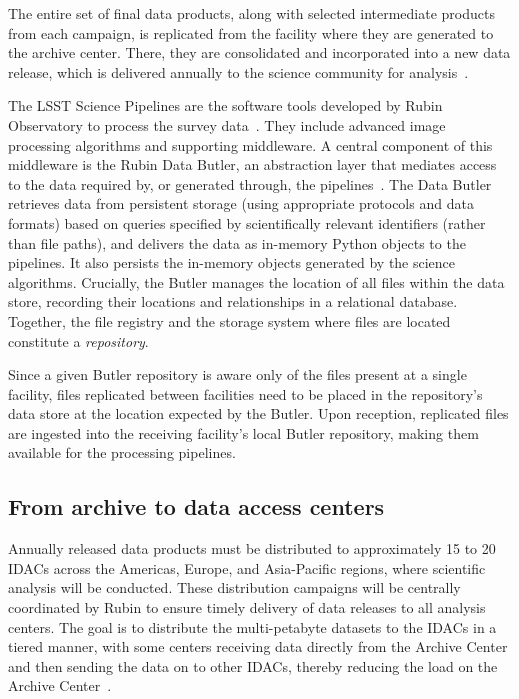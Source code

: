 \documentclass{webofc}
\begin{document}
The entire set of final data products, along with selected intermediate products from each campaign, is replicated from the facility where they are generated to the archive center. There, they are consolidated and incorporated into a new data release, which is delivered annually to the science community for analysis\ \cite{10.1051_epjconf_202429501042}.

The LSST Science Pipelines are the software tools developed by Rubin Observatory to process the survey data\ \cite{bosch-pipelines}. They include advanced image processing algorithms and supporting middleware. A central component of this middleware is the Rubin Data Butler, an abstraction layer that mediates access to the data required by, or generated through, the pipelines\ \cite{2022SPIE12189E..11J}. The Data Butler retrieves data from persistent storage (using appropriate protocols and data formats) based on queries specified by scientifically relevant identifiers (rather than file paths), and delivers the data as in-memory Python objects to the pipelines. It also persists the in-memory objects generated by the science algorithms. Crucially, the Butler manages the location of all files within the data store, recording their locations and relationships in a relational database. Together, the file registry and the storage system where files are located constitute a \emph{repository}.

Since a given Butler repository is aware only of the files present at a single facility, files replicated between facilities need to be placed in the repository's data store at the location expected by the Butler. Upon reception, replicated files are ingested into the receiving facility's local Butler repository, making them available for the processing pipelines.


\subsection{From archive to data access centers}
\label{summit-to-data-access-centers}

Annually released data products must be distributed to approximately 15 to 20 IDACs across the Americas, Europe, and Asia-Pacific regions, where scientific analysis will be conducted. These distribution campaigns will be centrally coordinated by Rubin to ensure timely delivery of data releases to all analysis centers. The goal is to distribute the multi-petabyte datasets to the IDACs in a tiered manner, with some centers receiving data directly from the Archive Center and then sending the data on to other IDACs, thereby reducing the load on the Archive Center\ \cite{RTN-086}.
\end{document}
